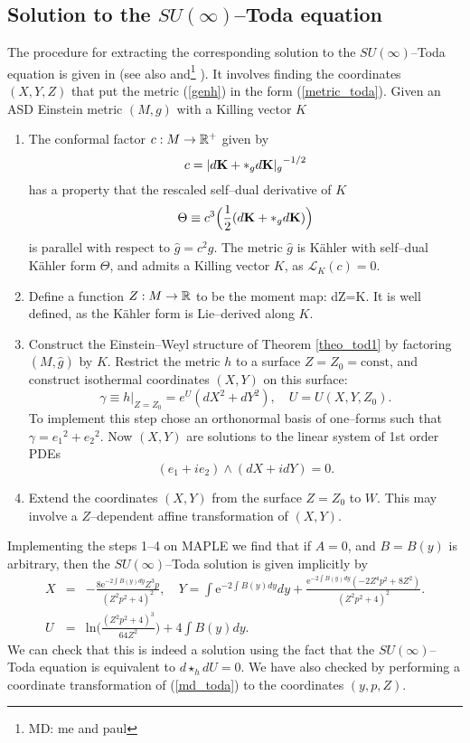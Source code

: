 \subsection{Solution to the $SU(\infty)$--Toda equation}
\label{steps_sec}
The procedure for extracting the corresponding solution to the $SU(\infty)$--Toda equation is given in \cite{Tod_note} 
(see also \cite{LeBrun} and\footnote{MD: me and paul} \cite{}). It involves finding the coordinates $(X,Y,Z)$ that put the metric (\ref{genh}) in the 
form (\ref{metric_toda}). Given an ASD Einstein metric $(M, g)$ with a
Killing vector $K$
\begin{enumerate}
\item The conformal factor $c:M\rightarrow \mathbb{R}^+$  given by
\[
c={|d{\bf K}+*_g d{\bf K}|_{g}}^{-1/2}
\]
has a property that
the rescaled self--dual derivative of $K$
\[
\Theta\equiv c^3\Big(\frac{1}{2}(d{\bf K}+*_g d{\bf K})\Big)
\]
is parallel with respect to $\hat{g}=c^2 g$.
The metric $\hat{g}$ is K\"ahler with  self--dual 
K\"ahler form $\Theta$, and admits a Killing vector $K$, as
${\mathcal L}_K(c)=0$.
\item
Define a function $Z:M\rightarrow \mathbb{R}$ to be the moment map:
\be
\label{ztilde}
dZ=K\hook \Theta.
\ee
It is well defined, as the K\"ahler form is Lie--derived along $K$.
\item
Construct the Einstein--Weyl structure of Theorem \ref{theo_tod1}
by factoring $(M, \hat{g})$ by $K$. Restrict the metric $h$
to a surface $Z=Z_0=\mbox{const}$, and construct isothermal coordinates 
$(X, Y)$ on this surface:
\[
\gamma\equiv h|_{Z=Z_0}=e^{U}(dX^2+dY^2), \quad U=U(X, Y, Z_0).
\]
To implement this step chose an orthonormal basis of one--forms
such that $\gamma= {e_1}^2+{e_2}^2$. Now $(X, Y)$ are solutions to the linear
system of 1st order PDEs
\[
(e_1+ie_2)\wedge (dX+idY)=0.
\]
\item Extend the coordinates $(X, Y)$ from the surface $Z=Z_0$ to $W$. This may
involve a $Z$--dependent affine transformation of $(X, Y)$.
\end{enumerate}
Implementing the steps 1--4 on MAPLE we find that if $A=0$, and $B=B(y)$ 
is arbitrary, then the $SU(\infty)$--Toda solution is given implicitly by
\begin{eqnarray}
\label{toda_implicit1}
 X&=&-\frac{8\mathrm{e}^{-2\int{B(y)dy}}Z^3p}{(Z^2p^2+4)^2},\quad
Y=\int{\mathrm{e}^{-2\int{B(y)dy}}dy}+\frac{\mathrm{e}^{-2\int{B(y)dy}}(-2Z^4p^2+8Z^2)}{(Z^2p^2+4)^2}.\nonumber\\
U&=&\mathrm{ln}\bigg(\frac{(Z^2p^2+4)^3}{64Z^2}\bigg)+4\int{B(y)dy}.
\end{eqnarray}
We can check that this is indeed a solution using the fact that the $SU(\infty)$--Toda equation is equivalent to 
$d\star_h dU=0$. We have also checked by performing a coordinate transformation of (\ref{md_toda}) to the coordinates $(y,p,Z)$.
